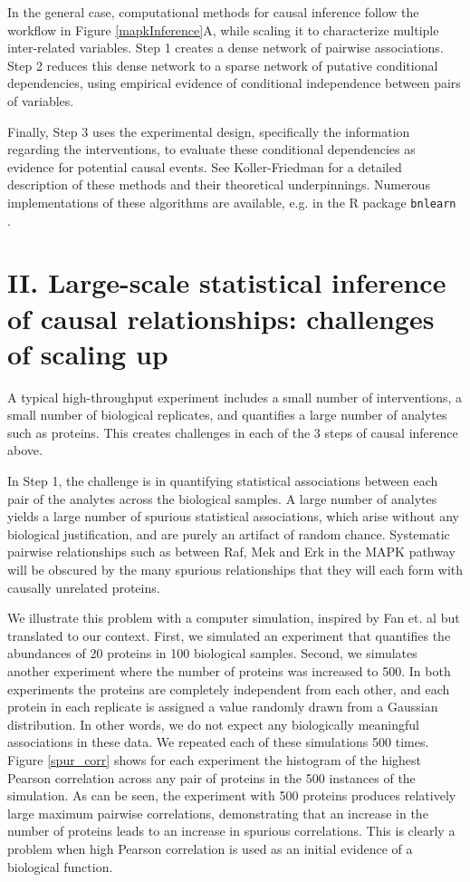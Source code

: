 \documentclass[journal=jacsat,manuscript=article]{achemso}
\begin{document}
In the general case, computational methods for causal inference follow the workflow  in Figure \ref{mapkInference}A, while scaling it to characterize multiple inter-related variables. Step 1 creates a dense network of pairwise associations. Step 2 reduces this dense network to a sparse network of putative conditional dependencies, using empirical evidence of  conditional independence between pairs of variables. 

Finally, Step 3 uses the experimental design, specifically the information regarding the interventions, to evaluate these conditional dependencies as evidence for potential causal events.  See Koller-Friedman \cite{koller2009probabilistic} for a detailed description of these methods and their theoretical underpinnings. Numerous implementations of these algorithms are available, e.g. in the R package {\tt bnlearn} \cite{scutari2009learning}. 

\section{II. Large-scale statistical inference of causal relationships: challenges of scaling up}

A typical high-throughput experiment includes a small number of interventions, a small number of biological replicates, and quantifies a large number of analytes such as proteins. This creates challenges in each of the 3 steps of causal inference above.

In Step 1, the challenge is in quantifying statistical associations between each pair of the analytes across the biological samples. A large number of analytes  yields a large number of spurious statistical associations, which arise without any biological justification, and are purely an artifact of random chance. Systematic pairwise relationships such as between Raf, Mek and Erk in the MAPK pathway will be obscured by the many spurious relationships that they will each form with causally unrelated proteins.

We illustrate this problem with a computer simulation, inspired by Fan et. al \cite{fan2014challenges} but translated to our context. First, we simulated an experiment that quantifies the abundances of 20 proteins in 100 biological samples.  Second, we simulates another experiment where the number of proteins was increased to 500.  In both experiments the proteins are completely independent from each other, and each protein in each replicate is assigned a value randomly drawn from a Gaussian distribution. In other words, we do not expect any biologically meaningful associations in these data. We repeated each of these simulations 500 times. Figure \ref{spur_corr} shows for each experiment the histogram of the highest Pearson correlation across any pair of proteins in the 500 instances of the simulation. As can be seen, the experiment with 500 proteins produces relatively large maximum pairwise correlations, demonstrating that an increase in the number of proteins leads to an increase in spurious correlations.  This is clearly a problem when high Pearson correlation is used as an initial evidence of a biological function.
\end{document}
